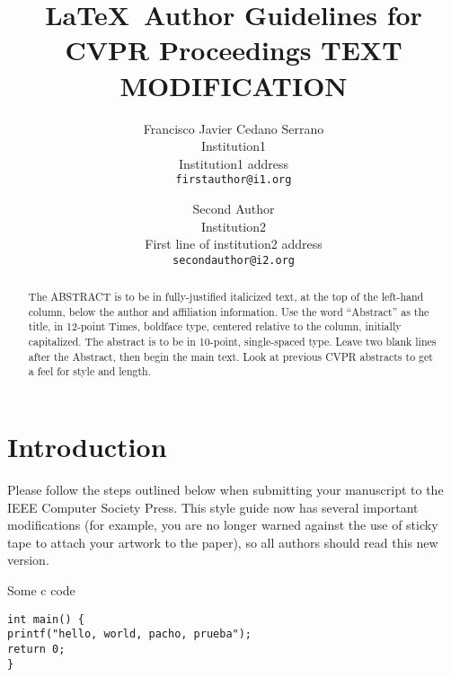 \documentclass[10pt,twocolumn,letterpaper]{article}
\begin{document}
\title{\LaTeX\ Author Guidelines for CVPR Proceedings TEXT MODIFICATION}

\author{Francisco Javier Cedano Serrano\\
Institution1\\
Institution1 address\\
{\tt\small firstauthor@i1.org}
\and
Second Author\\
Institution2\\
First line of institution2 address\\
{\tt\small secondauthor@i2.org}
}

\maketitle

\begin{abstract}
   The ABSTRACT is to be in fully-justified italicized text, at the top
   of the left-hand column, below the author and affiliation
   information. Use the word ``Abstract'' as the title, in 12-point
   Times, boldface type, centered relative to the column, initially
   capitalized. The abstract is to be in 10-point, single-spaced type.
   Leave two blank lines after the Abstract, then begin the main text.
   Look at previous CVPR abstracts to get a feel for style and length.
\end{abstract}

\section{Introduction}

Please follow the steps outlined below when submitting your manuscript to
the IEEE Computer Society Press.  This style guide now has several
important modifications (for example, you are no longer warned against the
use of sticky tape to attach your artwork to the paper), so all authors
should read this new version.





Some c code


\begin{verbatim}
int main() {
printf("hello, world, pacho, prueba");
return 0;
}
\end{verbatim}
\end{document}
